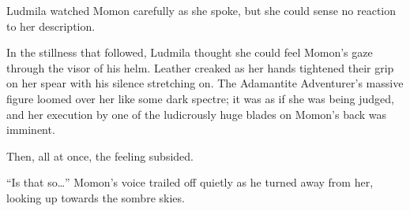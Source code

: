  

Ludmila watched Momon carefully as she spoke, but she could sense no reaction to her description.

 

In the stillness that followed, Ludmila thought she could feel Momon’s gaze through the visor of his helm. Leather creaked as her hands tightened their grip on her spear with his silence stretching on. The Adamantite Adventurer’s massive figure loomed over her like some dark spectre; it was as if she was being judged, and her execution by one of the ludicrously huge blades on Momon’s back was imminent.

 

Then, all at once, the feeling subsided.

 

“Is that so…” Momon’s voice trailed off quietly as he turned away from her, looking up towards the sombre skies.